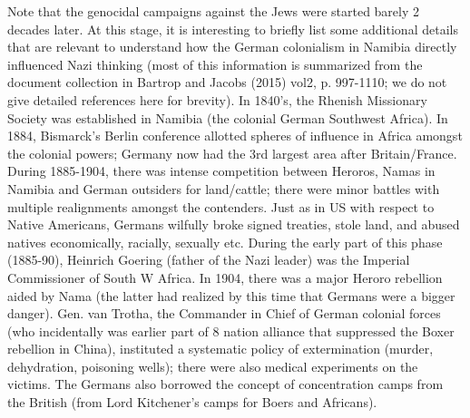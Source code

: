 Note that the genocidal campaigns against the Jews were started barely 2 decades later. At this stage, it is interesting to briefly list some additional details that are relevant to understand how the German colonialism in Namibia directly influenced Nazi thinking (most of this information is summarized from the document collection in Bartrop and Jacobs (2015) vol2, p. 997-1110; we do not give detailed references here for brevity). In 1840’s, the Rhenish Missionary Society was established in Namibia (the colonial German Southwest Africa). In 1884, Bismarck’s Berlin conference allotted spheres of influence in Africa amongst the colonial powers; Germany now had the 3rd largest area after Britain/France. During 1885-1904, there was intense competition between Heroros, Namas in Namibia and German outsiders for land/cattle; there were minor battles with multiple realignments amongst the contenders. Just as in US with respect to Native Americans, Germans wilfully broke signed treaties, stole land, and abused natives economically, racially, sexually etc. During the early part of this phase (1885-90), Heinrich Goering (father of the Nazi leader) was the Imperial Commissioner of South W Africa. In 1904, there was a major Heroro rebellion aided by Nama (the latter had realized by this time that Germans were a bigger danger). Gen. van Trotha, the Commander in Chief of German colonial forces (who incidentally was earlier part of 8 nation alliance that suppressed the Boxer rebellion in China), instituted a systematic policy of extermination (murder, dehydration, poisoning wells); there were also medical experiments on the victims. The Germans also borrowed the concept of concentration camps from the British (from Lord Kitchener's camps for Boers and Africans).

